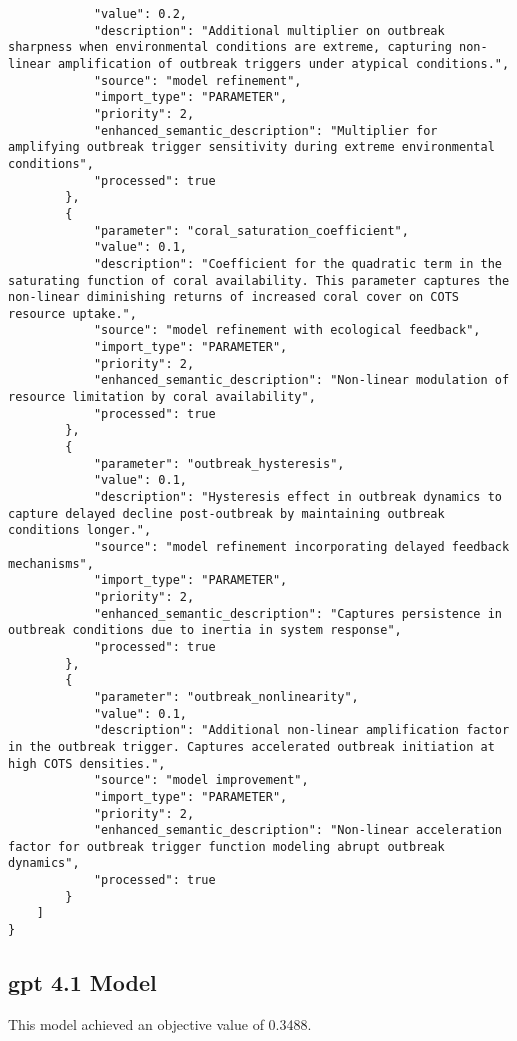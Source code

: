 \begin{lstlisting}
            "value": 0.2,
            "description": "Additional multiplier on outbreak sharpness when environmental conditions are extreme, capturing non-linear amplification of outbreak triggers under atypical conditions.",
            "source": "model refinement",
            "import_type": "PARAMETER",
            "priority": 2,
            "enhanced_semantic_description": "Multiplier for amplifying outbreak trigger sensitivity during extreme environmental conditions",
            "processed": true
        },
        {
            "parameter": "coral_saturation_coefficient",
            "value": 0.1,
            "description": "Coefficient for the quadratic term in the saturating function of coral availability. This parameter captures the non-linear diminishing returns of increased coral cover on COTS resource uptake.",
            "source": "model refinement with ecological feedback",
            "import_type": "PARAMETER",
            "priority": 2,
            "enhanced_semantic_description": "Non-linear modulation of resource limitation by coral availability",
            "processed": true
        },
        {
            "parameter": "outbreak_hysteresis",
            "value": 0.1,
            "description": "Hysteresis effect in outbreak dynamics to capture delayed decline post-outbreak by maintaining outbreak conditions longer.",
            "source": "model refinement incorporating delayed feedback mechanisms",
            "import_type": "PARAMETER",
            "priority": 2,
            "enhanced_semantic_description": "Captures persistence in outbreak conditions due to inertia in system response",
            "processed": true
        },
        {
            "parameter": "outbreak_nonlinearity",
            "value": 0.1,
            "description": "Additional non-linear amplification factor in the outbreak trigger. Captures accelerated outbreak initiation at high COTS densities.",
            "source": "model improvement",
            "import_type": "PARAMETER",
            "priority": 2,
            "enhanced_semantic_description": "Non-linear acceleration factor for outbreak trigger function modeling abrupt outbreak dynamics",
            "processed": true
        }
    ]
}
\end{lstlisting}
\clearpage
\subsection{gpt 4.1 Model}
This model achieved an objective value of 0.3488.

